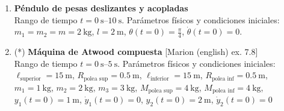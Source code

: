 \begin{enumerate}
\item 
	\begin{minipage}[t][3cm]{0.7\textwidth}
	\textbf{Péndulo de pesas deslizantes y acopladas}\\ 
	Rango de tiempo \(t = \SIrange{0}{10}{\second}\).
	Parámetros físicos y condiciones iniciales:\\
	\(m_1 = m_2 = m = \SI{2}{\kilo\gram}\), \(l = \SI{2}{\metre}\), \(\theta(t=0) = \frac{\pi}{4}\), \(\dot{\theta}(t=0) = 0\).
	\end{minipage}
	\begin{minipage}[c][2cm][t]{0.3\textwidth}
		
	\end{minipage}



%




\newpage
\item
\begin{minipage}[t][2cm]{0.65\textwidth}
(*) \textbf{Máquina de Atwood compuesta} [Marion (english) ex. 7.8]\\ 
Rango de tiempo \(t = \SIrange{0}{5}{\second}\).
Parámetros físicos y condiciones iniciales:\\
\(\ell_\text{superior} = \SI{15}{\metre}\), 
\(R_{\text{polea sup}} = \SI{0.5}{\metre}\), 
\(\ell_\text{inferior} = \SI{15}{\metre}\), 
\(R_{\text{polea inf}} = \SI{0.5}{\metre}\),\\ 
\(m_1 = \SI{1}{\kilo\gram}\),
\(m_2 = \SI{2}{\kilo\gram}\),
\(m_3 = \SI{3}{\kilo\gram}\),
\(M_{\text{polea sup}} = \SI{4}{\kilo\gram}\),
\(M_{\text{polea inf}} = \SI{4}{\kilo\gram}\),\\
\(y_1(t=0) = \SI{1}{\metre}\), \(\dot{y}_1(t=0) = 0\),
\(y_2(t=0) = \SI{2}{\metre}\), \(\dot{y}_2(t=0) = 0\)
\end{minipage}
\begin{minipage}[c][3cm][t]{0.3\textwidth}
	
\end{minipage}




\end{enumerate}

